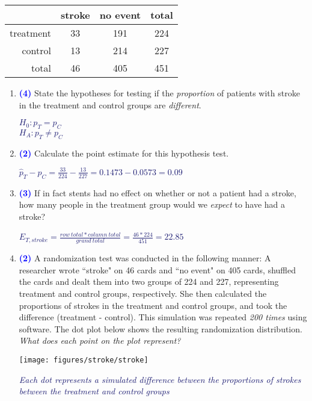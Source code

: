 \documentclass[11pt]{article}
\newcommand{\soln}[1]{\textcolor{MidnightBlue}{\textit{#1}}}	%
\newcommand{\pts}[1]{ \textbf{{\footnotesize \textcolor{blue}{(#1)}}} }	%
\begin{document}
\begin{enumerate}
\begin{center}
\begin{tabular}{r c c | c }
  \hline
 			& stroke		 & no event		& total \\ 
  \hline
treatment	 	& 33 			& 191 			& 224 \\ 
control	 	& 13			& 214 			& 227 \\ 
   \hline
total			& 46			& 405			& 451 \\
   \hline
\end{tabular}
\end{center}

\vspace{0.25cm}

\begin{enumerate}

\item \pts{4} State the hypotheses for testing if the \emph{proportion} of patients with stroke in the treatment and control groups are \emph{different}.

\soln{$H_0: p_T = p_C$ \\
$H_A: p_T \ne p_C$
}

\item \pts{2} Calculate the point estimate for this hypothesis test.

\soln{$\hat{p}_T - \hat{p}_C = \frac{33}{224} - \frac{13}{227} = 0.1473 - 0.0573 = 0.09$}

\item \pts{3} If in fact stents had no effect on whether or not a patient had a stroke, how many people in the treatment group would we \emph{expect} to have had a stroke?

\soln{$E_{T,stroke} = \frac{row~total * column~total}{grand~total} = \frac{46 * 224}{451} = 22.85$}
$\:$

\item \pts{2} A randomization test was conducted in the following manner: A researcher wrote ``stroke" on 46 cards and ``no event" on 405 cards, shuffled the cards and dealt them into two groups of 224 and 227, representing treatment and control groups, respectively. She then calculated the proportions of strokes in the treatment and control groups, and took the difference (treatment - control). This simulation was repeated \emph{200 times} using software. The dot plot below shows the resulting randomization distribution. \emph{What does each point on the plot represent?}
\begin{minipage}[c]{0.5\textwidth}
\texttt{[image: figures/stroke/stroke]}
\end{minipage}
\begin{minipage}[c]{0.3\textwidth}
\soln{Each dot represents a simulated difference between the proportions of strokes between the treatment and control groups}
\end{minipage}


\end{enumerate}
\end{enumerate}
\end{document}
